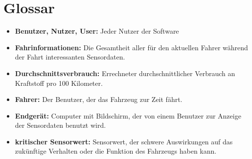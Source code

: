 \documentclass[pflichtenheft.tex]{subfiles}
\begin{document}
\chapter{Glossar}

\begin{itemize}

\item
\textbf{Benutzer, Nutzer, User:} Jeder Nutzer der Software

\item
\textbf{Fahrinformationen:} Die Gesamtheit aller für den aktuellen Fahrer während der Fahrt interessanten Sensordaten.

\item
\textbf{Durchschnittsverbrauch:} Errechneter durchschnittlicher Verbrauch an Kraftstoff pro 100 Kilometer.

\item
\textbf{Fahrer:} Der Benutzer, der das Fahrzeug zur Zeit fährt.

\item
\textbf{Endgerät:} Computer mit Bildschirm, der von einem Benutzer zur Anzeige der Sensordaten benutzt wird.

\item
\textbf{kritischer Sensorwert:} Sensorwert, der schwere Auswirkungen auf das zukünftige Verhalten oder die Funktion des Fahrzeugs haben kann.

\end{itemize}
\end{document}
